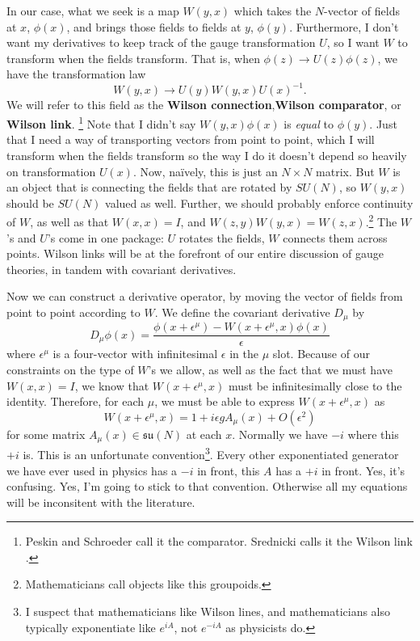 \documentclass[main.tex]{subfiles}
\begin{document}
In our case, what we seek is a map $W(y,x)$ which takes the $N$-vector of fields at $x$, $\phi(x)$, and brings those fields to fields at $y$, $\phi(y)$. Furthermore, I don't want my derivatives to keep track of the gauge transformation $U$, so I want $W$ to transform when the fields transform. That is, when $\phi (z) \to U(z) \phi(z)$, we have the transformation law
\[
W(y,x) \to U(y) W(y,x) U(x)^{-1}.
\]
We will refer to this field as the \textbf{Wilson connection},\textbf{Wilson comparator}, or \textbf{Wilson link}. \footnote{Peskin and Schroeder call it the comparator. \cite{pas} Srednicki calls it the Wilson link \cite{sred}.} Note that I didn't say $W(y,x) \phi(x)$ is \textit{equal} to $\phi(y)$. Just that I need a way of transporting vectors from point to point, which I will transform when the fields transform so the way I do it doesn't depend so heavily on transformation $U(x)$. Now, na\"ively, this is just an $N \times N$ matrix. But $W$ is an object that is connecting the fields that are rotated by $SU(N)$, so $W(y,x)$ should be $SU(N)$ valued as well. Further, we should probably enforce continuity of $W$, as well as that $W(x,x) = I$, and $W(z,y) W(y,x) = W(z,x)$.\footnote{Mathematicians call objects like this groupoids.} The $W$'s and $U$'s come in one package: $U$ rotates the fields, $W$ connects them across points. Wilson links will be at the forefront of our entire discussion of gauge theories, in tandem with covariant derivatives. 

Now we can construct a derivative operator, by moving the vector of fields from point to point according to $W$. We define the covariant derivative $D_\mu$ by
\begin{equation} \label{Dmu1}
D_\mu \phi (x)= \frac{\phi(x + \epsilon^\mu) - W(x + \epsilon^\mu,x) \phi(x)}{\epsilon}
\end{equation}
where $\epsilon^\mu$ is a four-vector with infinitesimal $\epsilon$ in the $\mu$ slot. Because of our constraints on the type of $W$'s we allow, as well as the fact that we must have $W(x,x) = I$, we know that $W(x + \epsilon^\mu,x)$ must be infinitesimally close to the identity. Therefore, for each $\mu$, we must be able to express $W(x+\epsilon^\mu,x)$ as 
\begin{equation} \label{inf1}
W(x +\epsilon^\mu,x) = 1 + i \epsilon g A_\mu (x) + O (\epsilon^2)
\end{equation}
for some matrix $A_\mu (x) \in \mathfrak{su}(N)$ at each $x$.  Normally we have $-i$ where this $+i$ is. This is an unfortunate convention\footnote{I suspect that mathematicians like Wilson lines, and mathematicians also typically exponentiate like $e^{i A}$, not $e^{-i A}$ as physicists do.}. Every other exponentiated generator we have ever used in physics has a $-i$ in front, this $A$ has a $+i$ in front. Yes, it's confusing. Yes, I'm going to stick to that convention. Otherwise all my equations will be inconsitent with the literature.
\end{document}

